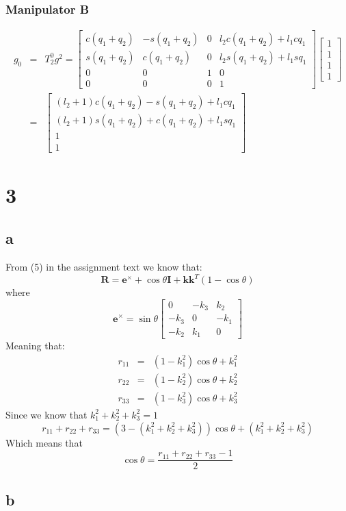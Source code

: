 \documentclass[11pt]{article}
\begin{document}
\subsubsection*{Manipulator B}
\begin{eqnarray*}
g_0 &=& T^0_2 g^2 = 
\begin{bmatrix}
c (q_1 + q_2) & - s (q_1 + q_2) & 0  & l_2 c (q_1 + q_2) + l_1 c q_1 \\
s (q_1 + q_2) & c (q_1 + q_2)   & 0  & l_2 s (q_1 + q_2) + l_1 s q_1 \\
0     & 0       & 1  & 0        \\
0     & 0       & 0  & 1
\end{bmatrix}
\begin{bmatrix}
1 \\
1 \\
1 \\
1
\end{bmatrix} \\
&=&
\begin{bmatrix}
(l_2 + 1) c (q_1 + q_2) - s (q_1 + q_2) + l_1 c q_1 \\
(l_2 + 1) s (q_1 + q_2) + c (q_1 + q_2) + l_1 s q_1 \\
1 \\
1
\end{bmatrix}
\end{eqnarray*}

\section*{3}
\subsection*{a}
From (5) in the assignment text we know that:
\[\mathbf{R} = \mathbf{e}^\times + \cos{\theta \mathbf{I}} + \mathbf{k}\mathbf{k}^T (1 - \cos{\theta}) \]
where
\[\mathbf{e}^\times = \sin{\theta}
\begin{bmatrix}
0 & -k_3 & k_2 \\
-k_3 & 0 & -k_1 \\
-k_2 & k_1 & 0
\end{bmatrix}
\]
Meaning that:
\begin{eqnarray*}
r_{11} &=& (1-k_1^2)\cos{\theta} + k_1^2 \\
r_{22} &=& (1-k_2^2)\cos{\theta} + k_2^2 \\
r_{33} &=& (1-k_3^2)\cos{\theta} + k_3^2
\end{eqnarray*}
Since we know that $k_1^2 + k_2^2 + k_3^2 = 1$
\[r_{11} + r_{22} + r_{33} = (3 - (k_1^2 + k_2^2 + k_3^2))\cos{\theta} + (k_1^2 + k_2^2 + k_3^2)\]
Which means that
\[\cos{\theta} = \frac{r_{11} + r_{22} + r_{33} - 1}{2}\]

\subsection*{b}
\end{document}

